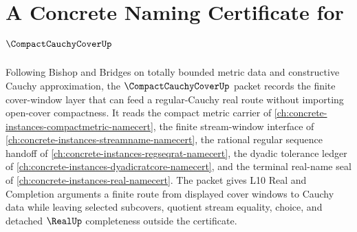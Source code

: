 \chapter{A Concrete Naming Certificate for $\CompactCauchyCoverUp$}
\label{ch:concrete-instances-compact-cauchy-cover-namecert}

Following Bishop and Bridges on totally bounded metric data and constructive Cauchy approximation, the $\CompactCauchyCoverUp$ packet records the finite cover-window layer that can feed a regular-Cauchy real route without importing open-cover compactness. It reads the compact metric carrier of \autoref{ch:concrete-instances-compactmetric-namecert}, the finite stream-window interface of \autoref{ch:concrete-instances-streamname-namecert}, the rational regular sequence handoff of \autoref{ch:concrete-instances-regseqrat-namecert}, the dyadic tolerance ledger of \autoref{ch:concrete-instances-dyadicratcore-namecert}, and the terminal real-name seal of \autoref{ch:concrete-instances-real-namecert}. The packet gives L10 Real and Completion arguments a finite route from displayed cover windows to Cauchy data while leaving selected subcovers, quotient stream equality, choice, and detached $\RealUp$ completeness outside the certificate.

